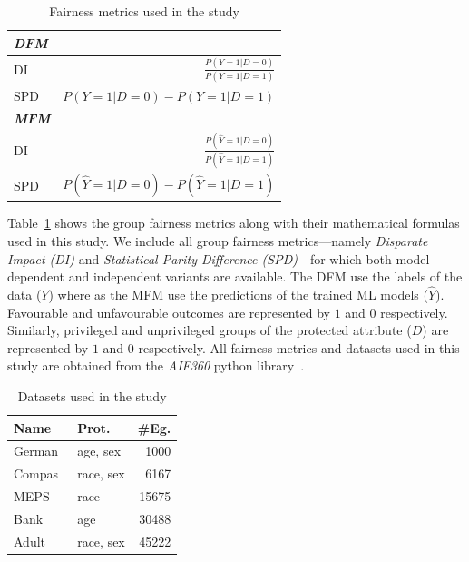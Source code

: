 \documentclass[sigconf,review,anonymous]{acmart}
\begin{document}
\begin{table}
  \centering
  \caption{Fairness metrics used in the study}
  \begin{tabular}{l r}
    \toprule
    \textbf{\emph{DFM}}\\
    \midrule
    DI & \(\displaystyle \frac{P(Y=1|D=0)}{P(Y=1|D=1)}\)\\
    SPD & \(\displaystyle P(Y=1|D=0)-P(Y=1|D=1)\)\\
    \midrule
    \textbf{\emph{MFM}}\\
    \midrule
    DI & \(\displaystyle \frac{P(\hat{Y}=1|D=0)}{P(\hat{Y}=1|D=1)}\)\\
    SPD & \(\displaystyle P(\hat{Y}=1|D=0)-P(\hat{Y}=1|D=1)\)\\
    \bottomrule
  \end{tabular}
  \label{tab:fairness-metrics}
\end{table}

Table \ref{tab:fairness-metrics} shows the group fairness metrics
along with their mathematical formulas used in this study. We include
all group fairness metrics---namely \emph{Disparate Impact (DI)} and
\emph{Statistical Parity Difference (SPD)}---for which both model
dependent and independent variants are available. The DFM use the
labels of the data ($Y$) where as the MFM use the predictions of the
trained ML models ($\hat{Y}$). Favourable and unfavourable outcomes
are represented by $1$ and $0$ respectively. Similarly, privileged and
unprivileged groups of the protected attribute ($D$) are represented
by $1$ and $0$ respectively. All fairness metrics and datasets used in
this study are obtained from the \emph{AIF360} python
library \cite{bellamy2019ai}.

\begin{table}
  \centering
  \caption{Datasets used in the study}
  \begin{tabular}{l l r}
    \toprule
    \textbf{Name} & \textbf{Prot.} & \textbf{\#Eg.}\\
    \midrule
    German \cite{hofmann1994german} & age, sex & 1000\\
    Compas\cite{angwin2016machine} & race, sex & 6167\\
    MEPS \cite{mepsdata} & race & 15675\\
    Bank\cite{moro2014data} & age & 30488\\
    Adult\cite{kohavi1996scaling} & race, sex & 45222\\
    \bottomrule
  \end{tabular}
  \label{tab:datasets}
\end{table}
\end{document}
